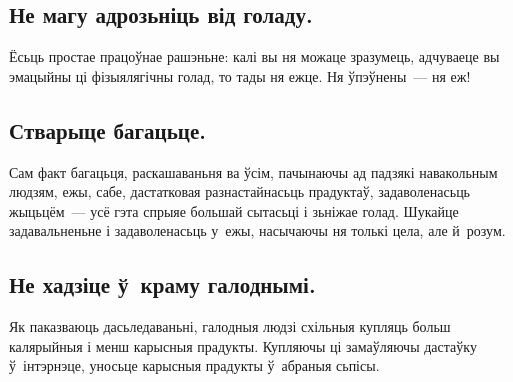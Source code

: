 \subsection{Не магу адрозьніць від голаду.}
Ёсьць простае працоўнае рашэньне: калі вы ня можаце зразумець, адчуваеце вы эмацыйны ці фізыялягічны голад, то тады ня ежце. Ня ўпэўнены~--- ня еж!

\subsection{Стварыце багацьце.}
Сам факт багацьця, раскашаваньня ва ўсім, пачынаючы ад падзякі навакольным людзям, ежы, сабе, дастатковая разнастайнасьць прадуктаў, задаволенасьць жыцьцём~--- усё гэта спрыяе большай сытасьці і зьніжае голад. Шукайце задавальненьне і задаволенасьць у~ежы, насычаючы ня толькі цела, але й~розум.

\subsection{Не хадзіце ў~краму галоднымі.}
Як паказваюць дасьледаваньні, галодныя людзі схільныя купляць больш калярыйныя і менш карысныя прадукты. Купляючы ці замаўляючы дастаўку ў~інтэрнэце, уносьце карысныя прадукты ў~абраныя сьпісы.
